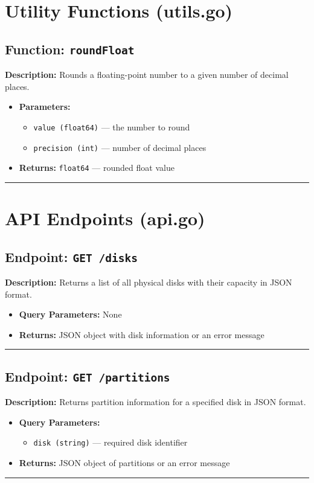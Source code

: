 \documentclass[12pt,a4paper]{article}
\begin{document}
\section{Utility Functions (utils.go)}

\subsection*{Function: \texttt{roundFloat}}
\textbf{Description:} Rounds a floating-point number to a given number of decimal places.
\begin{itemize}[leftmargin=2cm,label={--}]
  \item \textbf{Parameters:}
  \begin{itemize}
    \item \texttt{value (float64)} — the number to round
    \item \texttt{precision (int)} — number of decimal places
  \end{itemize}
  \item \textbf{Returns:} \texttt{float64} — rounded float value
\end{itemize}
\hrule\vspace{2em}


\newpage

\section{API Endpoints (api.go)}

\subsection*{Endpoint: \texttt{GET /disks}}
\textbf{Description:} Returns a list of all physical disks with their capacity in JSON format.
\begin{itemize}[leftmargin=2cm,label={--}]
  \item \textbf{Query Parameters:} None
  \item \textbf{Returns:} JSON object with disk information or an error message
\end{itemize}
\hrule\vspace{1em}

\subsection*{Endpoint: \texttt{GET /partitions}}
\textbf{Description:} Returns partition information for a specified disk in JSON format.
\begin{itemize}[leftmargin=2cm,label={--}]
  \item \textbf{Query Parameters:}
  \begin{itemize}
    \item \texttt{disk (string)} — required disk identifier
  \end{itemize}
  \item \textbf{Returns:} JSON object of partitions or an error message
\end{itemize}
\hrule\vspace{1em}
\end{document}
